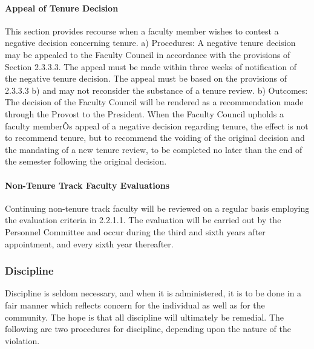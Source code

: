 \documentclass[letterpaper, 11pt]{article}
\begin{document}
			\paragraph{Appeal of Tenure Decision}
				This section provides recourse when a faculty member wishes to contest a negative decision concerning tenure.
				a) Procedures:
				A negative tenure decision may be appealed to the Faculty Council in accordance with the provisions of Section 2.3.3.3.  The appeal must be made within three weeks of notification of the negative tenure decision.  The appeal must be based on the provisions of 2.3.3.3 b) and may not reconsider the substance of a tenure review.
				b) Outcomes:
				The decision of the Faculty Council will be rendered as a recommendation made through the Provost to the President.  When the Faculty Council upholds a faculty memberÕs appeal of a negative decision regarding tenure, the effect is not to recommend tenure, but to recommend the voiding of the original decision and the mandating of a new tenure review, to be completed no later than the end of the semester following the original decision.
			\paragraph{Non-Tenure Track Faculty Evaluations}
				Continuing non-tenure track faculty will be reviewed on a regular basis employing the evaluation criteria in 2.2.1.1.  The evaluation will be carried out by the Personnel Committee and occur during the third and sixth years after appointment, and every sixth year thereafter.
		\subsubsection{Discipline}
			Discipline is seldom necessary, and when it is administered, it is to be done in a fair manner which reflects concern for the individual as well as for the community.  The hope is that all discipline will ultimately be remedial.  The following are two procedures for discipline, depending upon the nature of the violation.
\end{document}
